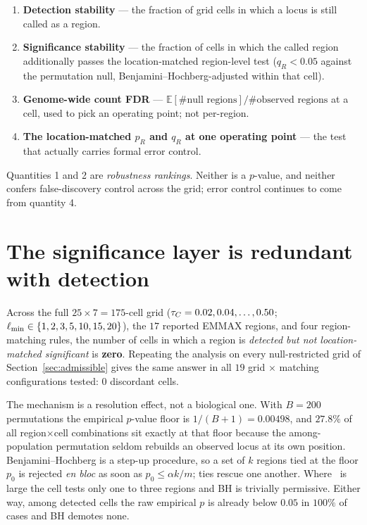 \begin{enumerate}\itemsep2pt
\item \textbf{Detection stability} --- the fraction of grid cells in which a locus is
      still called as a region.
\item \textbf{Significance stability} --- the fraction of cells in which the called
      region additionally passes the location-matched region-level test ($q_R<0.05$
      against the permutation null, Benjamini--Hochberg-adjusted within that cell).
\item \textbf{Genome-wide count FDR} --- $\mathbb{E}[\#\text{null regions}]/\#\text{observed
      regions}$ at a cell, used to pick an operating point; not per-region.
\item \textbf{The location-matched $p_R$ and $q_R$ at one operating point} --- the test
      that actually carries formal error control.
\end{enumerate}

Quantities 1 and 2 are \emph{robustness rankings}. Neither is a $p$-value, and
neither confers false-discovery control across the grid; error control continues to
come from quantity 4.

\section{The significance layer is redundant with detection}
\label{sec:redundant}

Across the full $25\times7=175$-cell grid ($\tau_C=0.02,0.04,\dots,0.50$;
$\ell_{\min}\in\{1,2,3,5,10,15,20\}$), the $17$ reported EMMAX regions, and four
region-matching rules, the number of cells in which a region is \emph{detected but not
location-matched significant} is \textbf{zero}. Repeating the analysis on every
null-restricted grid of Section~\ref{sec:admissible} gives the same answer in all
$19$ grid $\times$ matching configurations tested: $0$ discordant cells.

The mechanism is a resolution effect, not a biological one. With $B=200$
permutations the empirical $p$-value floor is $1/(B+1)=0.00498$, and $27.8\%$ of all
region$\times$cell combinations sit exactly at that floor because the
among-population permutation seldom rebuilds an observed locus at its own position.
Benjamini--Hochberg is a step-up procedure, so a set of $k$ regions tied at the floor
$p_0$ is rejected \emph{en bloc} as soon as $p_0\le\alpha k/m$; ties rescue one
another. Where \lmin\ is large the cell tests only one to three regions and BH is
trivially permissive. Either way, among detected cells the raw empirical $p$ is
already below $0.05$ in $100\%$ of cases and BH demotes none.

